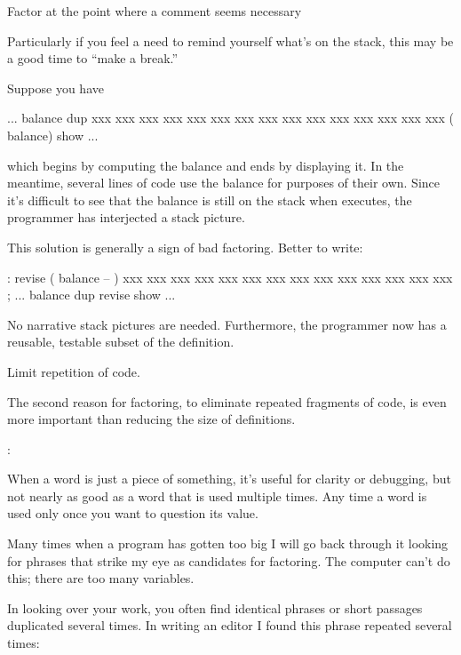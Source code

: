 \begin{tip}
Factor at the point where a comment seems necessary
\end{tip}
Particularly if you feel a need to remind yourself what's on the
stack, this may be a good time to ``make a break.''

\goodbreak
Suppose you have
\begin{Code}
... balance  dup xxx xxx xxx xxx xxx xxx xxx xxx xxx
     xxx xxx xxx xxx xxx xxx   ( balance) show  ...
\end{Code}
which begins by computing the balance and ends by displaying it. In
the meantime, several lines of code use the balance for purposes of
their own. Since it's difficult to see that the balance is still on
the stack when  executes, the programmer has interjected a
stack picture.

This solution is generally a sign of bad factoring. Better to write:
\begin{Code}
: revise  ( balance -- )  xxx xxx xxx xxx xxx xxx xxx
     xxx xxx xxx xxx xxx xxx xxx ;
... balance  dup revise  show  ...
\end{Code}
No narrative stack pictures are needed. Furthermore, the programmer
now has a reusable, testable subset of the definition.

\begin{tip}
Limit repetition of code.
\end{tip}
%
The second reason for factoring, to eliminate repeated fragments of
code, is even more important than reducing the size of definitions.

\begin{interview}
:

\begin{tfquot}
When a word is just a piece of something, it's useful for clarity or
debugging, but not nearly as good as a word that is used multiple
times. Any time a word is used only once you want to question its
value.

Many times when a program has gotten too big I will go back through it
looking for phrases that strike my eye as candidates for factoring.
The computer can't do this; there are too many variables.
\end{tfquot}
\end{interview}
In looking over your work, you often find identical phrases or short
passages duplicated several times. In writing an editor I found this
phrase repeated several times:

